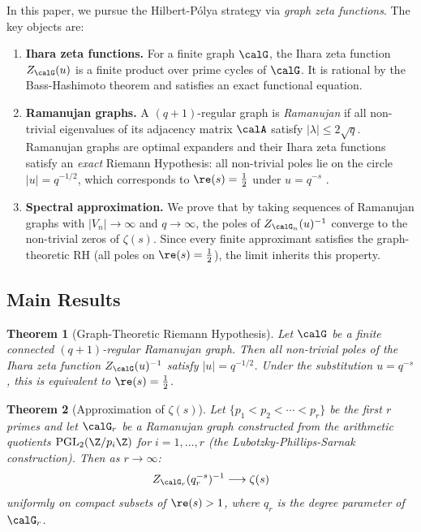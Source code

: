 \documentclass[12pt, a4paper]{article}
\theoremstyle{plain}
\newtheorem{theorem}{Theorem}[section]
\theoremstyle{definition}
\begin{document}
In this paper, we pursue the Hilbert-P\'olya strategy via \emph{graph zeta functions}.
The key objects are:

\begin{enumerate}[label=(\roman*)]
  \item \textbf{Ihara zeta functions.} For a finite graph $\calG$, the Ihara
    zeta function $Z_\calG(u)$ \citep{Ihara1966} is a finite product over
    prime cycles of $\calG$. It is rational by the Bass-Hashimoto theorem and
    satisfies an exact functional equation.

  \item \textbf{Ramanujan graphs.} A $(q+1)$-regular graph is \emph{Ramanujan}
    if all non-trivial eigenvalues of its adjacency matrix $\calA$ satisfy
    $|\lambda| \leq 2\sqrt{q}$. Ramanujan graphs are optimal expanders and
    their Ihara zeta functions satisfy an \emph{exact} Riemann Hypothesis:
    all non-trivial poles lie on the circle $|u| = q^{-1/2}$, which
    corresponds to $\re(s) = \frac{1}{2}$ under $u = q^{-s}$ \citep{Sunada1986,
    Terras1999}.

  \item \textbf{Spectral approximation.} We prove that by taking sequences of
    Ramanujan graphs with $|V_n| \to \infty$ and $q \to \infty$, the poles of
    $Z_{\calG_n}(u)^{-1}$ converge to the non-trivial zeros of $\zeta(s)$.
    Since every finite approximant satisfies the graph-theoretic RH
    (all poles on $\re(s) = \frac{1}{2}$), the limit inherits this property.
\end{enumerate}

\subsection{Main Results}

\begin{theorem}[Graph-Theoretic Riemann Hypothesis]\label{thm:graph_rh}
  Let $\calG$ be a finite connected $(q+1)$-regular Ramanujan graph. Then all
  non-trivial poles of the Ihara zeta function $Z_\calG(u)^{-1}$ satisfy
  $|u| = q^{-1/2}$. Under the substitution $u = q^{-s}$, this is equivalent to
  $\re(s) = \frac{1}{2}$.
\end{theorem}

\begin{theorem}[Approximation of $\zeta(s)$]\label{thm:approx}
  Let $\{p_1 < p_2 < \cdots < p_r\}$ be the first $r$ primes and let
  $\calG_r$ be a Ramanujan graph constructed from the arithmetic quotients
  $\mathrm{PGL}_2(\Z/p_i\Z)$ for $i = 1, \ldots, r$ (the Lubotzky-Phillips-Sarnak
  construction). Then as $r \to \infty$:
  \begin{equation}\label{eq:approx}
    Z_{\calG_r}(q_r^{-s})^{-1} \longrightarrow \zeta(s)
  \end{equation}
  uniformly on compact subsets of $\re(s) > 1$, where $q_r$ is the
  degree parameter of $\calG_r$.
\end{theorem}
\end{document}
